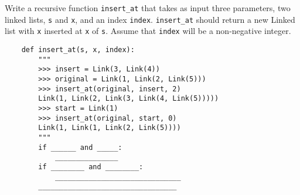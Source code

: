\begin{blocksection}
    \question Write a recursive function \lstinline{insert_at} that takes as input three parameters, two linked lists, \lstinline{s}  and \lstinline{x}, and an index \lstinline{index}.  \lstinline{insert_at} should return a new Linked list with \lstinline{x} inserted at \lstinline{x} of \lstinline{s}. Assume that \lstinline{index} will be a non-negative integer.

    
    \begin{lstlisting}
    def insert_at(s, x, index):
        """
        >>> insert = Link(3, Link(4))
        >>> original = Link(1, Link(2, Link(5)))
        >>> insert_at(original, insert, 2)
        Link(1, Link(2, Link(3, Link(4, Link(5)))))
        >>> start = Link(1)
        >>> insert_at(original, start, 0)
        Link(1, Link(1, Link(2, Link(5))))
        """
        if ______ and _____:
            _______________
        if ________ and ________:
            ______________________________
        _________________________________
    
    \end{lstlisting}
\end{blocksection}
